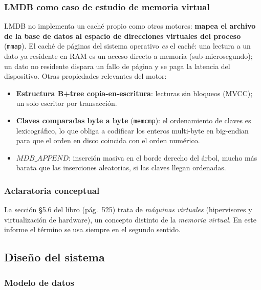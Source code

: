 \documentclass[12pt, letterpaper]{article}
\begin{document}
\subsubsection{LMDB como caso de estudio de memoria virtual}

LMDB no implementa un caché propio como otros motores: \textbf{mapea el
archivo de la base de datos al espacio de direcciones virtuales del proceso}
(\texttt{mmap}). El caché de páginas del sistema operativo \emph{es} el
caché: una lectura a un dato ya residente en RAM es un acceso directo a
memoria (sub-microsegundo); un dato no residente dispara un fallo de página y
se paga la latencia del dispositivo. Otras propiedades relevantes del motor:

\begin{itemize}
    \item \textbf{Estructura B+tree copia-en-escritura}: lecturas sin
    bloqueos (MVCC); un solo escritor por transacción.
    \item \textbf{Claves comparadas byte a byte} (\texttt{memcmp}): el
    ordenamiento de claves es lexicográfico, lo que obliga a codificar los
    enteros multi-byte en big-endian para que el orden en disco coincida con
    el orden numérico.
    \item \textbf{$MDB\_APPEND$}: inserción masiva en el borde derecho del
    árbol, mucho más barata que las inserciones aleatorias, si las claves
    llegan ordenadas.
\end{itemize}

\subsubsection{Aclaratoria conceptual}

La sección §5.6 del libro (pág.~525) trata de \emph{máquinas virtuales}
(hipervisores y virtualización de hardware), un concepto distinto de la
\emph{memoria virtual}. En este informe el término se usa siempre en el
segundo sentido.

\subsection{Diseño del sistema}

\subsubsection{Modelo de datos}
\end{document}
